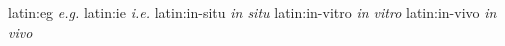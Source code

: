\newglsXbasic%
{latin:eg}%
{\textit{e.g.}}%
\newglsXbasic%
{latin:ie}%
{\textit{i.e.}}%
\newglsXbasic%
{latin:in-situ}%
{\textit{in situ}}%
\newglsXbasic%
{latin:in-vitro}%
{\textit{in vitro}}%
\newglsXbasic%
{latin:in-vivo}%
{\textit{in vivo}}%
